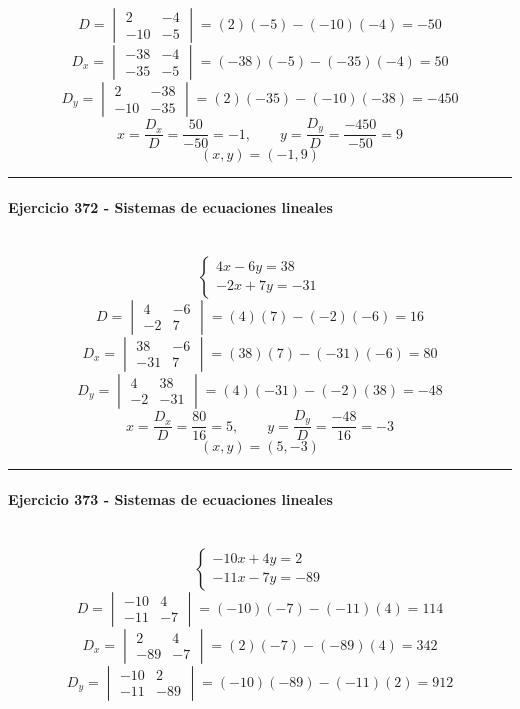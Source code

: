 \documentclass[10pt,a4paper]{article}
\newcommand{\res}[1]{\paragraph{#1}\mbox{}\\[-1.2em]}
\begin{document}
\[ D=\begin{vmatrix}2&-4\\-10&-5\end{vmatrix}=(2)(-5)-(-10)(-4)=-50 \]
\[ D_x=\begin{vmatrix}-38&-4\\-35&-5\end{vmatrix}=(-38)(-5)-(-35)(-4)=50 \]
\[ D_y=\begin{vmatrix}2&-38\\-10&-35\end{vmatrix}=(2)(-35)-(-10)(-38)=-450 \]
\[ x=\frac{D_x}{D}=\frac{50}{-50}=-1,\qquad y=\frac{D_y}{D}=\frac{-450}{-50}=9 \]
\[ \boxed{(x,y)=(-1,9)} \]
\vspace{1mm}\hrule\vspace{2mm}
\res{Ejercicio 372 - Sistemas de ecuaciones lineales}
\[ \begin{cases}4 x - 6 y=38\\- 2 x + 7 y=-31\end{cases} \]
\[ D=\begin{vmatrix}4&-6\\-2&7\end{vmatrix}=(4)(7)-(-2)(-6)=16 \]
\[ D_x=\begin{vmatrix}38&-6\\-31&7\end{vmatrix}=(38)(7)-(-31)(-6)=80 \]
\[ D_y=\begin{vmatrix}4&38\\-2&-31\end{vmatrix}=(4)(-31)-(-2)(38)=-48 \]
\[ x=\frac{D_x}{D}=\frac{80}{16}=5,\qquad y=\frac{D_y}{D}=\frac{-48}{16}=-3 \]
\[ \boxed{(x,y)=(5,-3)} \]
\vspace{1mm}\hrule\vspace{2mm}
\res{Ejercicio 373 - Sistemas de ecuaciones lineales}
\[ \begin{cases}- 10 x + 4 y=2\\- 11 x - 7 y=-89\end{cases} \]
\[ D=\begin{vmatrix}-10&4\\-11&-7\end{vmatrix}=(-10)(-7)-(-11)(4)=114 \]
\[ D_x=\begin{vmatrix}2&4\\-89&-7\end{vmatrix}=(2)(-7)-(-89)(4)=342 \]
\[ D_y=\begin{vmatrix}-10&2\\-11&-89\end{vmatrix}=(-10)(-89)-(-11)(2)=912 \]
\end{document}
